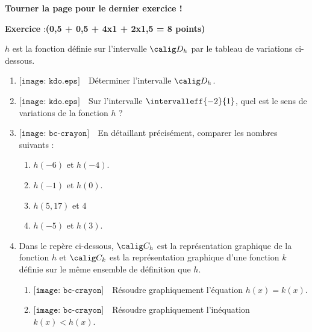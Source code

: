 \documentclass[10pt,french]{book}
\newcounter{exoc}
\newenvironment{exoc}[1]{%
  \refstepcounter{exoc}\textbf{Exercice \theexoc} :\hfill {\textbf{(#1)}}\par
  \medskip}%
{\medskip}
\newcommand\Kdo[1][1em]{$\texttt{[image: kdo.eps]}\hspace{#1}$}
\newcommand\Red[1][1em]{$\texttt{[image: bc-crayon]}\hspace{#1}$}
\begin{document}
\begin{center}
\textbf{Tourner la page pour le dernier exercice !}
\end{center}\clearpage

\begin{exoc}{0,5 + 0,5 + 4x1 + 2x1,5 = 8 points}
    $h$ est la fonction définie sur l'intervalle $\calig D_h$ par le tableau de variations ci-dessous.

\begin{center}
\end{center}

\begin{enumerate}
    \item \Kdo Déterminer l'intervalle $\calig D_h$.
    \item \Kdo Sur l'intervalle $\intervalleff{-2}{1}$, quel est le sens de variations de la fonction $h$ ?
    \item \Red En détaillant précisément, comparer les nombres suivants :
        \begin{enumerate}
            \item $h(-6)$ et $h(-4)$.
            \item $h(-1)$ et $h(0)$.
            \item $h(5,17)$ et $4$
            \item $h(-5)$ et $h(3)$.
        \end{enumerate}
    \item Dans le repère \OIJ ci-dessous, $\calig C_h$ est la représentation graphique de la fonction $h$ et $\calig C_k$ est la représentation graphique d'une fonction $k$ définie sur le même ensemble de définition que $h$.
        \begin{enumerate}
            \item \Red Résoudre graphiquement l'équation $h(x) = k(x)$.
            \item \Red Résoudre graphiquement l'inéquation $k(x) < h(x)$.
        \end{enumerate}
\end{enumerate}


\end{exoc}
\end{document}
